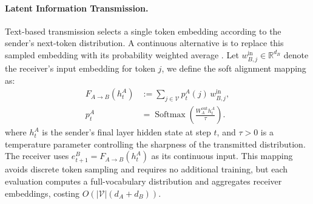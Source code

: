\documentclass[11pt]{article}
\begin{document}
\paragraph{Latent Information Transmission.}
Text-based transmission selects a single token embedding according to the sender's next-token distribution. A continuous alternative is to replace this sampled embedding with its probability weighted average \citep{soft_thinking}. 
Let $w_{B,j}^{\mathrm{in}}\in\mathbb{R}^{d_B}$ denote the receiver's input embedding for token $j$, we define the soft alignment mapping as:
\begin{equation}
\begin{aligned}
    F_{A\rightarrow B}(h_t^A)
    &:= \sum_{j\in\mathcal{V}}
        p_t^A(j)\,w_{B,j}^{\mathrm{in}}, \\
    p_t^A
    &= \operatorname{Softmax}\!
        \left(\frac{W_A^{\mathrm{out}}h_t^A}{\tau}\right).
\end{aligned}
\label{eq:distribution_transition}
\end{equation}
where $h_t^A$ is the sender's final layer hidden state at step $t$, and $\tau>0$ is a temperature parameter controlling the sharpness of the transmitted distribution. The receiver uses $e_{t+1}^B=F_{A\rightarrow B}(h_t^A)$ as its continuous input. 
This mapping avoids discrete token sampling and requires no additional training, but each evaluation computes a full-vocabulary distribution and aggregates receiver embeddings, costing $O(|\mathcal{V}|(d_A+d_B))$.
\end{document}
